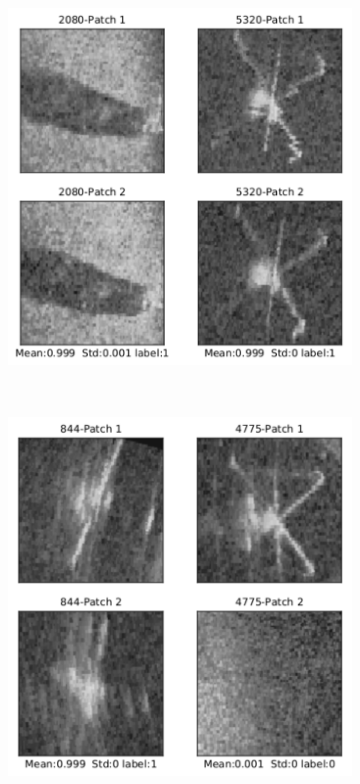 \begin{figure}[ht]
  \centering
  \begin{subfigure}[b]{4.2cm}
    \includegraphics[width=\textwidth]{images/densenet/prediction_images_lowest_stds_1_grey}
    \label{fig:prediction_images_lowest_stds_1}
  \end{subfigure}
  ~ %
  \begin{subfigure}[b]{4.2cm}
    \includegraphics[width=\textwidth]{images/densenet/prediction_images_lowest_stds_2_grey}

\end{subfigure}
\end{figure}
